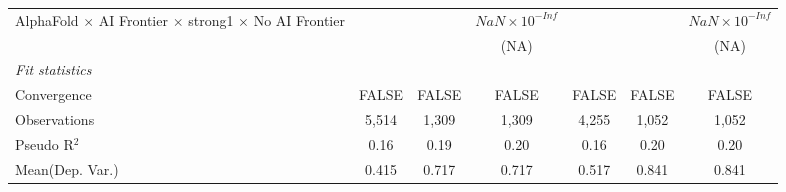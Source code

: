 \begin{tabular}{lcccccc}
   AlphaFold $\times$ AI Frontier $\times$ strong1 $\times$ No AI Frontier    &                        &                        & $NaN\times 10^{-Inf}$  &                        &                        & $NaN\times 10^{-Inf}$\\    
                                                                              &                        &                        & (NA)                   &                        &                        & (NA)\\   
   \midrule
   \emph{Fit statistics}\\
   Convergence                                                                &FALSE                   & FALSE                  & FALSE                  & FALSE                  & FALSE                  & FALSE\\  
   Observations                                                               & 5,514                  & 1,309                  & 1,309                  & 4,255                  & 1,052                  & 1,052\\  
   Pseudo R$^2$                                                               & 0.16                   & 0.19                   & 0.20                   & 0.16                   & 0.20                   & 0.20\\  
Mean(Dep. Var.) & 0.415 & 0.717 & 0.717 & 0.517 & 0.841 & 0.841 \\
   

\end{tabular}
